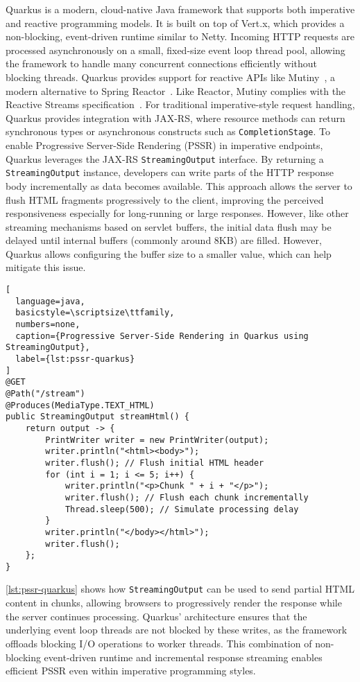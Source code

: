 Quarkus is a modern, cloud-native Java framework that supports both imperative
and reactive programming models. It is built on top of Vert.x,
which provides a non-blocking, event-driven runtime similar to Netty. Incoming
HTTP requests are processed asynchronously on a small, fixed-size event loop
thread pool, allowing the framework to handle many concurrent connections
efficiently without blocking threads. 
Quarkus provides support for reactive APIs like Mutiny~\cite{mutiny2021}, a
modern alternative to Spring Reactor~\cite{projectreactor}. Like Reactor,
Mutiny complies with the Reactive Streams specification~\cite{ReactiveStreams}.
For traditional imperative-style request handling, Quarkus provides integration
with JAX-RS, where resource methods can return synchronous types or
asynchronous constructs such as \texttt{CompletionStage}. To enable Progressive
Server-Side Rendering (PSSR) in imperative endpoints, Quarkus leverages the
JAX-RS \texttt{StreamingOutput} interface. By returning a
\texttt{StreamingOutput} instance, developers can write parts of the HTTP
response body incrementally as data becomes available. This approach allows the
server to flush HTML fragments progressively to the client, improving the
perceived responsiveness especially for long-running or large responses.
However, like other streaming mechanisms based on servlet buffers, the initial
data flush may be delayed until internal buffers (commonly around 8KB) are
filled. However, Quarkus allows configuring the buffer size to a smaller value, which
can help mitigate this issue.

\begin{lstlisting}[
  language=java,
  basicstyle=\scriptsize\ttfamily,
  numbers=none,
  caption={Progressive Server-Side Rendering in Quarkus using StreamingOutput},
  label={lst:pssr-quarkus}
]
@GET
@Path("/stream")
@Produces(MediaType.TEXT_HTML)
public StreamingOutput streamHtml() {
    return output -> {
        PrintWriter writer = new PrintWriter(output);
        writer.println("<html><body>");
        writer.flush(); // Flush initial HTML header
        for (int i = 1; i <= 5; i++) {
            writer.println("<p>Chunk " + i + "</p>");
            writer.flush(); // Flush each chunk incrementally
            Thread.sleep(500); // Simulate processing delay
        }
        writer.println("</body></html>");
        writer.flush();
    };
}
\end{lstlisting}

\autoref{lst:pssr-quarkus} shows how \texttt{StreamingOutput} can be used to send
partial HTML content in chunks, allowing browsers to progressively render the
response while the server continues processing. Quarkus’ architecture ensures
that the underlying event loop threads are not blocked by these writes, as the
framework offloads blocking I/O operations to worker threads. This combination
of non-blocking event-driven runtime and incremental response streaming enables
efficient PSSR even within imperative programming styles.